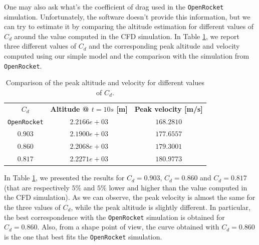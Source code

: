 One may also ask what's the coefficient of drag used in the \texttt{OpenRocket} simulation.
Unfortunately, the software doesn't provide this information, but we can try to estimate it by comparing the altitude estimation for different values of $C_d$ around the value computed in the CFD simulation.
In Table \ref{tab:openrocket_cd}, we report three different values of $C_d$ and the corresponding peak altitude and velocity computed using our simple model and the comparison with the simulation from \texttt{OpenRocket}.

\begin{table}[H]
    \centering
    \begin{tabular}{|c|c|c|}
        \hline
        $C_d$               & \textbf{Altitude @ $t=10s$ [m]} & \textbf{Peak velocity [m/s]} \\
        \texttt{OpenRocket} & $2.2166e+03$                    & $168.2810$                   \\
        $0.903$             & $2.1900e+03$                    & $177.6557$                   \\
        $0.860$             & $2.2068e+03$                    & $179.3001$                   \\
        $0.817$             & $2.2271e+03$                    & $180.9773$                   \\
        \hline
    \end{tabular}
    \caption{Comparison of the peak altitude and velocity for different values of $C_d$.}
    \label{tab:openrocket_cd}
\end{table}

In Table \ref{tab:openrocket_cd}, we presented the results for $C_d = 0.903$, $C_d = 0.860$ and $C_d = 0.817$ (that are respectively $5\%$ and $5\%$ lower and higher than the value computed in the CFD simulation).
As we can observe, the peak velocity is almost the same for the three values of $C_d$, while the peak altitude is slightly different.
In particular, the best correspondence with the \texttt{OpenRocket} simulation is obtained for $C_d = 0.860$.
Also, from a shape point of view, the curve obtained with $C_d = 0.860$ is the one that best fits the \texttt{OpenRocket} simulation.
